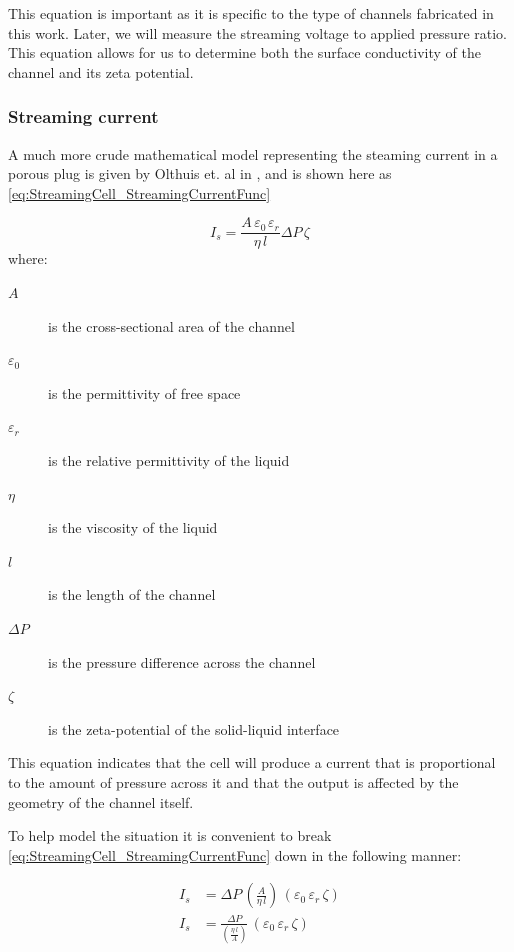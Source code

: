 This equation is important as it is specific to the type of channels fabricated in this work.
Later, we will measure the streaming voltage to applied pressure ratio.
This equation allows for us to determine both the surface conductivity of the channel and its zeta potential.

\subsubsection*{Streaming current}

A much more crude mathematical model representing the steaming current in a porous plug is given by Olthuis et. al in \cite{Olthuis2005}, and is shown here as \ref{eq:StreamingCell_StreamingCurrentFunc}

\begin{equation}
    I_{s}=\frac{A\,\varepsilon_{0\,}\varepsilon_{r}}{\eta\,l}\Delta P\,\zeta
    \label{eq:StreamingCell_StreamingCurrentFunc}
\end{equation}
where:

\begin{description}
    \item [{$A$}] is the cross-sectional area of the channel
    \item [{$\varepsilon_{0}$}] is the permittivity of free space
    \item [{$\varepsilon_{r}$}] is the relative permittivity of the liquid
    \item [{$\eta$}] is the viscosity of the liquid
    \item [{$l$}] is the length of the channel
    \item [{$\Delta P$}] is the pressure difference across the channel
    \item [{$\zeta$}] is the zeta-potential of the solid-liquid interface
\end{description}
This equation indicates that the cell will produce a current that is proportional to the amount of pressure across it and
that the output is affected by the geometry of the channel itself.


To help model the situation it is convenient to break \cref{eq:StreamingCell_StreamingCurrentFunc} down in the following
manner:

\pagebreak
\begin{align}
    I_{s} & = \Delta P\,\left(\frac{A}{\eta\,l}\right)\,\left(\varepsilon_{0}\,\varepsilon_{r}\,\zeta\right)\nonumber\\
    \label{eq:streaming_current_rearranged}I_{s} & = \frac{\Delta P}{\left(\frac{\eta\,l}{A}\right)}\,\left(\varepsilon_{0}\,\varepsilon_{r}\,\zeta\right)
\end{align}

